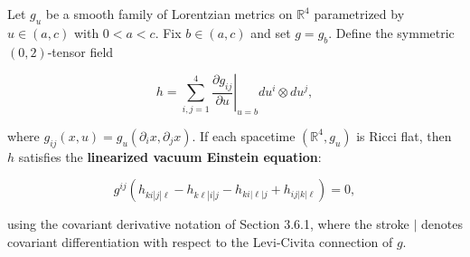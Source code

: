 Let $g_u$ be a smooth family of Lorentzian metrics on $\mathbb{R}^4$ parametrized by $u \in (a, c)$ with $0 < a < c$. Fix $b \in (a, c)$ and set $g = g_b$. Define the symmetric $(0,2)$-tensor field

$$
h = \sum_{i,j=1}^{4} \left.\frac{\partial g_{ij}}{\partial u}\right|_{u=b} du^i \otimes du^j,
$$

where $g_{ij}(x,u) = g_u(\partial_i x, \partial_j x)$. If each spacetime $(\mathbb{R}^4, g_u)$ is Ricci flat, then $h$ satisfies the \textbf{linearized vacuum Einstein equation}:

$$
g^{ij}\left(h_{ki|j|\ell} - h_{k\ell|i|j} - h_{ki|\ell|j} + h_{ij|k|\ell}\right) = 0,
$$

using the covariant derivative notation of Section 3.6.1, where the stroke $|$ denotes covariant differentiation with respect to the Levi-Civita connection of $g$.
